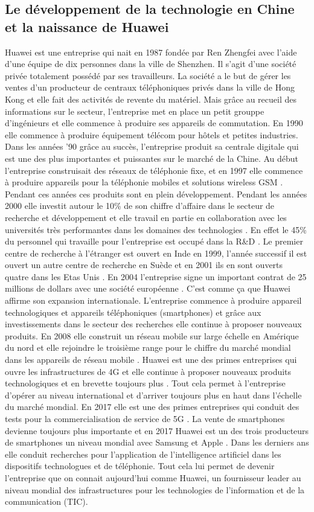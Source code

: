 \subsection{Le développement de la technologie en Chine et la naissance de Huawei}
Huawei est une entreprise qui nait en 1987 fondée par Ren Zhengfei  avec l’aide d’une équipe de dix personnes dans la ville de Shenzhen.  Il s’agit d’une société privée totalement possédé par ses travailleurs.  La société a le but de gérer les ventes d’un producteur de centraux téléphoniques privés dans la ville de Hong Kong et elle fait des activités de revente du matériel.    Mais grâce au recueil des informations sur le secteur, l’entreprise met en place un petit grouppe d’ingénieurs et elle commence à produire ses appareils de commutation.  En 1990 elle commence à produire équipement télécom pour hôtels et petites industries.  Dans les années ’90 grâce au succès, l’entreprise produit sa centrale digitale qui est une des plus importantes et puissantes sur le marché de la Chine. Au début l’entreprise construisait des réseaux de téléphonie fixe, et en 1997 elle commence à produire appareils pour la téléphonie mobiles et solutions wireless GSM . Pendant ces années ces produits sont en plein développement. Pendant les années 2000 elle investit autour le 10\% de son chiffre d’affaire dans le secteur de recherche et développement et elle travail en partie en collaboration avec les universités très performantes dans les domaines des technologies . En effet le 45\% du personnel qui travaille pour l’entreprise est occupé dans la R&D . Le premier centre de recherche à l’étranger est ouvert en Inde en 1999, l’année successif il est ouvert un autre centre de recherche en Suède et en 2001 ils en sont ouverts quatre dans les Etas Unis . En 2004 l’entreprise signe un important contrat de 25 millions de dollars avec une société européenne .  C’est comme ça que Huawei affirme son expansion internationale. L’entreprise commence à produire appareil technologiques et appareils téléphoniques (smartphones) et grâce aux investissements dans le secteur des recherches elle continue à proposer nouveaux produits. En 2008 elle construit un réseau mobile sur large échelle en Amérique du nord et elle rejoindre le troisième range pour le chiffre du marché mondial dans les appareils de réseau mobile . Huawei est une des primes entreprises qui ouvre les infrastructures de 4G et elle continue à proposer nouveaux produits technologiques et en brevette toujours plus . Tout cela permet à l’entreprise d’opérer au niveau international et d’arriver toujours plus en haut dans l’échelle du marché mondial. En 2017 elle est une des primes entreprises qui conduit des tests pour la commercialisation de service de 5G . La vente de smartphones devienne toujours plus importante et en 2017 Huawei est un des trois producteurs de smartphones un niveau mondial avec Samsung et Apple . Dans les derniers ans elle conduit recherches pour l’application de l’intelligence artificiel dans les dispositifs technologues et de téléphonie.  Tout cela lui permet de devenir l’entreprise que on connait aujourd’hui comme Huawei, un fournisseur leader au niveau mondial des infrastructures pour les technologies de l’information et de la communication (TIC). 
